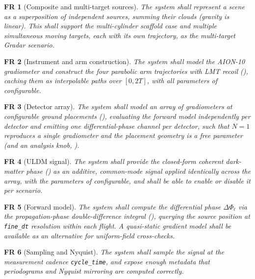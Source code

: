 \documentclass[11pt,a4paper]{article}
\theoremstyle{reqstyle}
\newtheorem{freq}{FR}
\begin{document}
\begin{freq}[Composite and multi-target sources]
The system shall represent a scene as a superposition of independent sources, summing their
clouds (gravity is linear). This shall support the multi-cylinder scaffold case and
\emph{multiple simultaneous moving targets}, each with its own trajectory, as the multi-target
Gradar scenario.
\end{freq}

\begin{freq}[Instrument and arm construction]
The system shall model the AION-10 gradiometer and construct the four parabolic arm
trajectories with LMT recoil (), caching them as interpolable paths over
$[0,2T]$, with all parameters of  configurable.
\end{freq}

\begin{freq}[Detector array]
The system shall model an array of gradiometers at configurable ground placements
(), evaluating the forward model independently per detector and emitting one
differential-phase channel per detector, such that $N{=}1$ reproduces a single gradiometer and
the placement geometry is a free parameter (and an analysis knob, ).
\end{freq}

\begin{freq}[ULDM signal]
The system shall provide the closed-form coherent dark-matter phase () as an
additive, common-mode signal applied identically across the array, with the parameters of
 configurable, and shall be able to enable or disable it per scenario.
\end{freq}

\begin{freq}[Forward model]
The system shall compute the differential phase $\Delta\Phi_\ell$ via the propagation-phase
double-difference integral (), querying the source position
at \texttt{fine\_dt} resolution within each flight. A quasi-static gradient model shall be
available as an alternative for uniform-field cross-checks.
\end{freq}

\begin{freq}[Sampling and Nyquist]
The system shall sample the signal at the measurement cadence \texttt{cycle\_time}, and
expose enough metadata that periodograms and Nyquist mirroring are computed correctly.
\end{freq}
\end{document}
